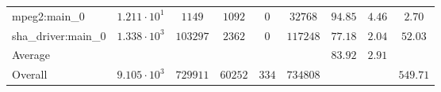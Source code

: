 \begin{tabular}{|l|c|c|c|c|c|c|c|c|}
mpeg2:main\_0           & $ 1.211 \cdot 10^{1} $ & $ 1149   $ & $ 1092  $ & $ 0   $ & $ 32768  $ & $ 94.85       $ & $ 4.46    $ & $ 2.70    $ \\
sha\_driver:main\_0     & $ 1.338 \cdot 10^{3} $ & $ 103297 $ & $ 2362  $ & $ 0   $ & $ 117248 $ & $ 77.18       $ & $ 2.04    $ & $ 52.03   $ \\
\hline
Average                 & $                    $ & $        $ & $       $ & $     $ & $        $ & $ 83.92       $ & $ 2.91    $ & $         $ \\
\hline
Overall                 & $ 9.105 \cdot 10^{3} $ & $ 729911 $ & $ 60252 $ & $ 334 $ & $ 734808 $ & $             $ & $         $ & $ 549.71  $ \\
\hline
\end{tabular}

